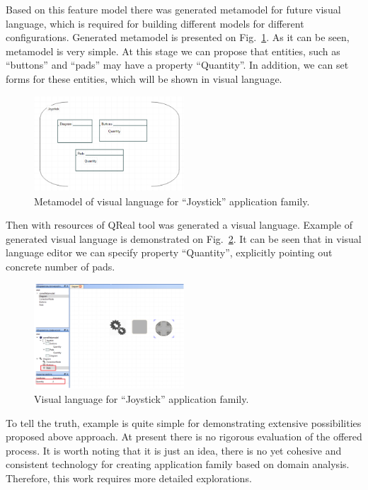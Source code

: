 \documentclass[conference]{IEEEtran}
\begin{document}
Based on this feature model there was generated metamodel for future visual language, which is required for building different models for different configurations. Generated metamodel is presented on Fig.~\ref{image:joystickMetamodel}. As it can be seen, metamodel is very simple. At this stage we can propose that entities, such as ``buttons'' and ``pads'' may have a property ``Quantity''. In addition, we can set forms for these entities, which will be shown in visual language. 

\begin{figure}[H]
	\centering
	\includegraphics[width=0.5\textwidth]{joystickMetamodel.png}
	\caption{Metamodel of visual language for ``Joystick'' application family.}
	\label{image:joystickMetamodel}
\end{figure}

Then with resources of QReal tool was generated a visual language. Example of generated visual language is demonstrated on Fig.~\ref{image:joystickDsl}. It can be seen that in visual language editor we can specify property ``Quantity'', explicitly pointing out concrete number of pads. 

\begin{figure}[H]
	\centering
	\includegraphics[width=0.5\textwidth]{joystickDsl.png}
	\caption{Visual language for ``Joystick'' application family.}
	\label{image:joystickDsl}
\end{figure}

To tell the truth, example is quite simple for demonstrating extensive possibilities proposed above approach. At present there is no rigorous evaluation of the offered process. It is worth noting that it is just an idea, there is no yet cohesive and consistent technology for creating application family based on domain analysis. Therefore, this work requires more detailed explorations.  
\end{document}

